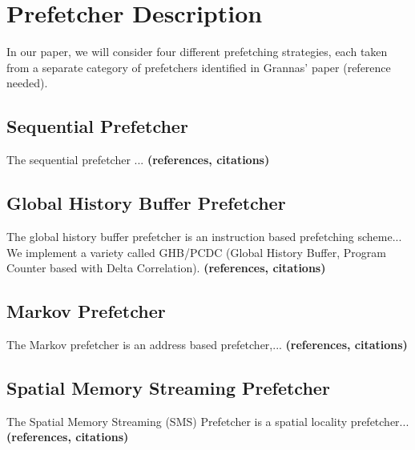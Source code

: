 
\section{Prefetcher Description}
\label{sec:prefetcherDescription}

In our paper, we will consider four different prefetching strategies,
each taken from a separate category of prefetchers identified in
Grannas' paper (reference needed).

\subsection{Sequential Prefetcher}
\label{sec:sequentialPrefetcher}
The sequential prefetcher ... 
{\bf (references, citations)}

\subsection{Global History Buffer Prefetcher}
\label{sec:ghbPcdcPrefetcher}
The global history buffer prefetcher is an instruction based
prefetching scheme... We implement a variety called GHB/PCDC (Global
History Buffer, Program Counter based with Delta Correlation).
{\bf (references, citations)}

\subsection{Markov Prefetcher}
\label{sec:markovPrefetcher}
The Markov prefetcher is an address based prefetcher,...
{\bf (references, citations)}

\subsection{Spatial Memory Streaming Prefetcher}
\label{sec:smsPrefetcher}
The Spatial Memory Streaming (SMS) Prefetcher is a spatial locality
prefetcher...  {\bf (references, citations)}
